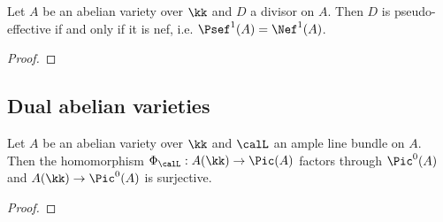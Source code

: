     \begin{corollary}\label{cor:psef_iff_nef_for_abelian_varieties}
        Let \(A\) be an abelian variety over \(\kk\) and \(D\) a divisor on \(A\).
        Then \(D\) is pseudo-effective if and only if it is nef, i.e. \(\Psef^1(A) = \Nef^1(A)\).
    \end{corollary}
    \begin{proof}
    \end{proof}






\subsection{Dual abelian varieties}

    \begin{proposition}\label{prop:ample_line_bundles_induce_surjective_homomorphisms}
        Let \(A\) be an abelian variety over \(\kk\) and \(\calL\) an ample line bundle on \(A\).
        Then the homomorphism \(\Phi_\calL: A(\kk) \to \Pic(A)\) factors through \(\Pic^0(A)\) and \(A(\kk) \to \Pic^0(A)\) is surjective.
    \end{proposition}
    \begin{proof}
    \end{proof}


